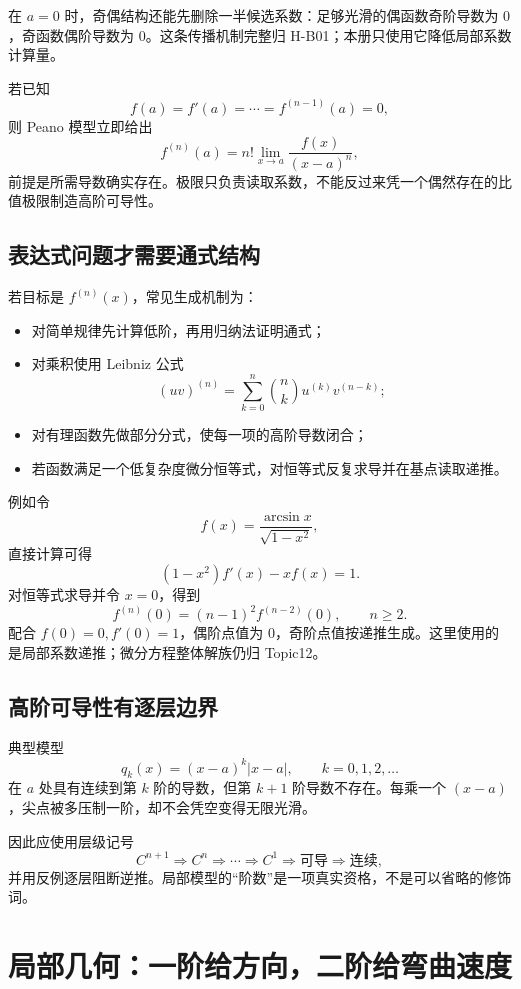 \documentclass[11pt,a4paper]{ctexart}
\begin{document}
在 $a=0$ 时，奇偶结构还能先删除一半候选系数：足够光滑的偶函数奇阶导数为 $0$，奇函数偶阶导数为 $0$。这条传播机制完整归 H-B01；本册只使用它降低局部系数计算量。

若已知
\[
f(a)=f'(a)=\cdots=f^{(n-1)}(a)=0,
\]
则 Peano 模型立即给出
\[
f^{(n)}(a)=n!\lim_{x\to a}\frac{f(x)}{{(x-a)}^n},
\]
前提是所需导数确实存在。极限只负责读取系数，不能反过来凭一个偶然存在的比值极限制造高阶可导性。

\subsection{表达式问题才需要通式结构}

若目标是 $f^{(n)}(x)$，常见生成机制为：
\begin{itemize}
  \item 对简单规律先计算低阶，再用归纳法证明通式；
  \item 对乘积使用 Leibniz 公式
  \[
  {(uv)}^{(n)}=\sum_{k=0}^{n}\binom{n}{k}u^{(k)}v^{(n-k)};
  \]
  \item 对有理函数先做部分分式，使每一项的高阶导数闭合；
  \item 若函数满足一个低复杂度微分恒等式，对恒等式反复求导并在基点读取递推。
\end{itemize}

例如令
\[
f(x)=\frac{\arcsin x}{\sqrt{1-x^2}},
\]
直接计算可得
\[
(1-x^2)f'(x)-xf(x)=1.
\]
对恒等式求导并令 $x=0$，得到
\[
f^{(n)}(0)={(n-1)}^2f^{(n-2)}(0),
\qquad n\ge2.
\]
配合 $f(0)=0,f'(0)=1$，偶阶点值为 $0$，奇阶点值按递推生成。这里使用的是局部系数递推；微分方程整体解族仍归 Topic12。

\subsection{高阶可导性有逐层边界}

典型模型
\[
q_k(x)={(x-a)}^k\lvert x-a\rvert,
\qquad k=0,1,2,\ldots
\]
在 $a$ 处具有连续到第 $k$ 阶的导数，但第 $k+1$ 阶导数不存在。每乘一个 $(x-a)$，尖点被多压制一阶，却不会凭空变得无限光滑。

因此应使用层级记号
\[
C^{n+1}\Longrightarrow C^n\Longrightarrow\cdots\Longrightarrow C^1
\Longrightarrow\text{可导}\Longrightarrow\text{连续},
\]
并用反例逐层阻断逆推。局部模型的“阶数”是一项真实资格，不是可以省略的修饰词。

\section{局部几何：一阶给方向，二阶给弯曲速度}
\end{document}
